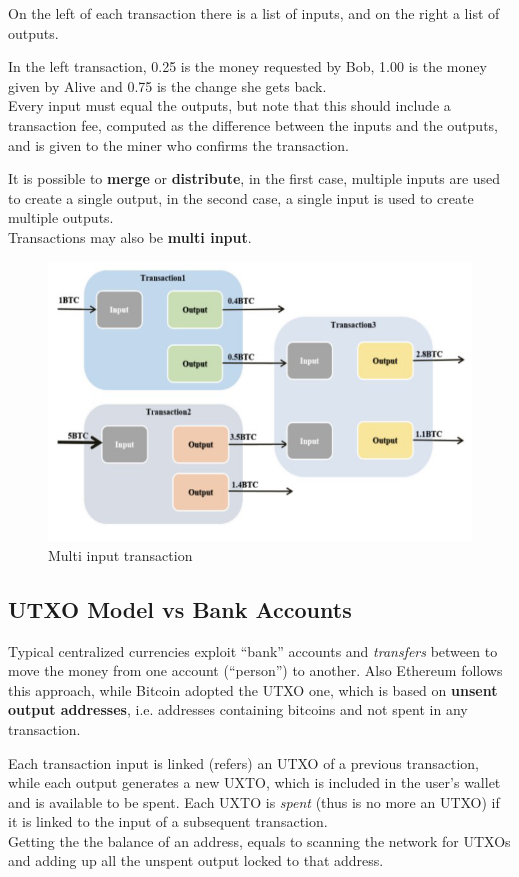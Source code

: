 On the left of each transaction there is a list of inputs, and on the right a list of outputs. 

In the left transaction, 0.25 is the money requested by Bob, 1.00 is the money given by Alive and 0.75 is the change she gets back.\\
Every input must equal the outputs, but note that this should include a transaction fee, computed as the difference between the inputs and the outputs, and is given to the miner who confirms the transaction.

It is possible to \textbf{merge} or \textbf{distribute}, in the first case, multiple inputs are used to create a single output, in the second case, a single input is used to create multiple outputs.\\
Transactions may also be \textbf{multi input}.

\begin{figure}[htbp]
   \centering
   \includegraphics{images/bitcoin_multiinput.png}
   \caption{Multi input transaction}
   \label{fig:bitcoin_multiinput}
\end{figure}

\subsection{UTXO Model vs Bank Accounts}
Typical centralized currencies exploit ``bank'' accounts and \textit{transfers} between to move the money from one account (``person'') to another.
Also Ethereum follows this approach, while Bitcoin adopted the UTXO one, which is based on \textbf{unsent output addresses}, i.e. addresses containing bitcoins and not spent in any
transaction.

Each transaction input is linked (refers) an UTXO of
a previous transaction, while each output generates a new UXTO, which is included in the user's wallet and is available to be spent.
Each UXTO is \textit{spent} (thus is no more an UTXO) if it is linked to the input of a subsequent transaction.\\
Getting the the balance of an address, equals to scanning the network for UTXOs and adding up all the unspent output locked to that address.

